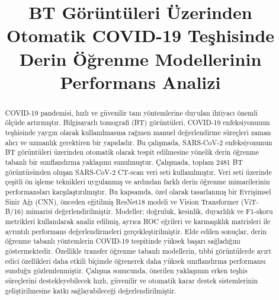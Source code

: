 \documentclass[conference]{IEEEtran}
\begin{document}
\title{BT Görüntüleri Üzerinden Otomatik COVID-19 Teşhisinde Derin Öğrenme Modellerinin Performans Analizi\\}

\author{
\and
{}
}

\maketitle

\begin{abstract}
COVID-19 pandemisi, hızlı ve güvenilir tanı yöntemlerine duyulan ihtiyacı önemli ölçüde artırmıştır. Bilgisayarlı tomografi (BT) görüntüleri, COVID-19 enfeksiyonunun teşhisinde yaygın olarak kullanılmasına rağmen manuel değerlendirme süreçleri zaman alıcı ve uzmanlık gerektiren bir yapıdadır. Bu çalışmada, SARS-CoV-2 enfeksiyonunun BT görüntüleri üzerinden otomatik olarak tespit edilmesine yönelik derin öğrenme tabanlı bir sınıflandırma yaklaşımı sunulmuştur. Çalışmada, toplam 2481 BT görüntüsünden oluşan SARS-CoV-2 CT-scan veri seti kullanılmıştır. Veri seti üzerinde çeşitli ön işleme teknikleri uygulanmış ve ardından farklı derin öğrenme mimarilerinin performansları karşılaştırılmıştır. Bu kapsamda, özel olarak tasarlanmış bir Evrişimsel Sinir Ağı (CNN), önceden eğitilmiş ResNet18 modeli ve Vision Transformer (ViT-B/16) mimarisi değerlendirilmiştir. Modeller; doğruluk, kesinlik, duyarlılık ve F1-skoru metrikleri kullanılarak analiz edilmiş, ayrıca ROC eğrileri ve karmaşıklık matrisleri ile ayrıntılı performans değerlendirmeleri gerçekleştirilmiştir. Elde edilen sonuçlar, derin öğrenme tabanlı yöntemlerin COVID-19 tespitinde yüksek başarı sağladığını göstermektedir. Özellikle transfer öğrenme tabanlı modellerin, tıbbi görüntülerde ayırt edici özellikleri daha etkili biçimde öğrenerek daha yüksek sınıflandırma performansı sunduğu gözlemlenmiştir. Çalışma sonucunda, önerilen yaklaşımın erken teşhis süreçlerini destekleyebilecek hızlı, güvenilir ve otomatik karar destek sistemlerinin geliştirilmesine katkı sağlayabileceği değerlendirilmiştir.
\end{abstract}
\end{document}

